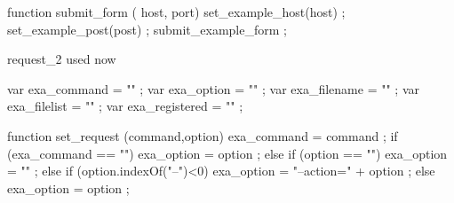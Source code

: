     function submit_form ( host, port) {
        set_example_host(host) ;
        set_example_post(post) ;
        submit_example_form ;
    }

\stopJSpreamble

\startJSpreamble request_2 used now

    var exa_command    = "" ;
    var exa_option     = "" ;
    var exa_filename   = "" ;
    var exa_filelist   = "" ;
    var exa_registered = "" ;

    function set_request (command,option) {
        exa_command = command ;
        if (exa_command == "") {
            exa_option = option ;
        } else { if (option == "") {
            exa_option = "" ;
        } else { if (option.indexOf("--")<0) {
            exa_option = "--action=" + option ;
        } else {
            exa_option = option ;
        } } }
    }

